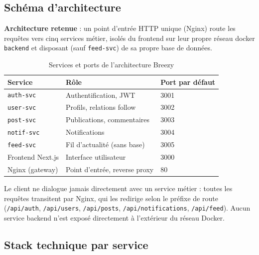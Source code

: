 \documentclass{cesi}
\begin{document}
\subsection{Schéma d'architecture}

\begin{infobox}
\textbf{Architecture retenue} : un point d'entrée HTTP unique (Nginx) route les
requêtes vers cinq services métier, isolés du frontend sur leur propre réseau docker
\texttt{backend} et disposant (sauf \texttt{feed-svc}) de sa propre base de données.
\end{infobox}

\begin{table}[H]
\centering
\begin{tabularx}{\linewidth}{l l l}
\toprule
\textbf{Service} & \textbf{Rôle} & \textbf{Port par défaut} \\
\midrule
\texttt{auth-svc}  & Authentification, JWT             & 3001 \\
\texttt{user-svc}  & Profils, relations follow         & 3002 \\
\texttt{post-svc}  & Publications, commentaires        & 3003 \\
\texttt{notif-svc} & Notifications                     & 3004 \\
\texttt{feed-svc}  & Fil d'actualité (sans base)        & 3005 \\
Frontend Next.js   & Interface utilisateur             & 3000 \\
Nginx (gateway)    & Point d'entrée, reverse proxy     & 80 \\
\bottomrule
\end{tabularx}
\caption{Services et ports de l'architecture Breezy}
\end{table}

Le client ne dialogue jamais directement avec un service métier : toutes les
requêtes transitent par Nginx, qui les redirige selon le préfixe de route
(\texttt{/api/auth}, \texttt{/api/users}, \texttt{/api/posts},
\texttt{/api/notifications}, \texttt{/api/feed}). Aucun service backend n'est
exposé directement à l'extérieur du réseau Docker.

\subsection{Stack technique par service}
\end{document}
